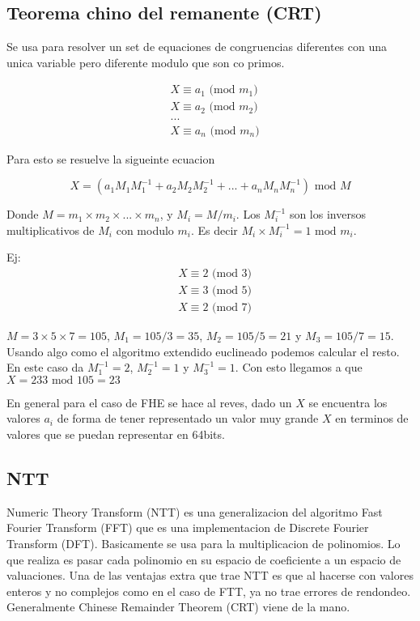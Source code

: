 \documentclass[12pt, oneside]{article}
\begin{document}
\subsection{Teorema chino del remanente (CRT)}
Se usa para resolver un set de equaciones de congruencias diferentes con  una unica variable
pero diferente modulo que son co primos.

\begin{align*}
    &X \equiv a_1 \text{ (mod } m_1)\\
    &X \equiv a_2 \text{ (mod } m_2)\\
    &... \\
    &X \equiv a_n \text{ (mod } m_n)
\end{align*}

Para esto se resuelve la sigueinte ecuacion

\begin{equation}
    X=(a_1M_1M_1^{-1}+a_2M_2M_2^{-1}+...+a_nM_nM_n^{-1})\text{ mod } M
    \label{eq:crt}
\end{equation}

Donde $M=m_1\times m_2\times ...\times m_n$, y $M_i=M/m_i$.
Los $M_i^{-1}$ son los inversos multiplicativos de $M_i$ con modulo $m_i$.
Es decir $M_i\times M_i^{-1} = 1 \text{ mod }m_i$.

Ej:
\begin{align*}
    &X \equiv 2 \text{ (mod } 3)\\
    &X \equiv 3 \text{ (mod } 5)\\
    &X \equiv 2 \text{ (mod } 7)
\end{align*}

$M=3\times5\times7=105$, $M_1=105/3=35$, $M_2=105/5=21$ y $M_3=105/7=15$.
Usando algo como el algoritmo extendido euclineado podemos calcular el resto.
En este caso da $M_1^{-1}=2$, $M_2^{-1}=1$ y  $M_3^{-1}=1$.
Con esto llegamos a que $X=233 \text{ mod } 105 = 23$

En general para el caso de FHE se hace al reves, dado un $X$ se encuentra los
valores $a_i$ de forma de tener representado un valor muy grande $X$ en terminos
de valores que se puedan representar en 64bits.




\subsection{NTT}
Numeric Theory Transform (NTT) es una generalizacion del algoritmo Fast Fourier Transform (FFT)
que es una implementacion de Discrete Fourier Transform (DFT).
Basicamente se usa para la multiplicacion de polinomios.
Lo que realiza es pasar cada polinomio en su espacio de coeficiente a un espacio de valuaciones.
Una de las ventajas extra que trae NTT es que al hacerse con valores enteros y no complejos como en el caso
de FTT, ya no trae errores de rendondeo.
Generalmente Chinese Remainder Theorem (CRT) viene de la mano.
\end{document}
